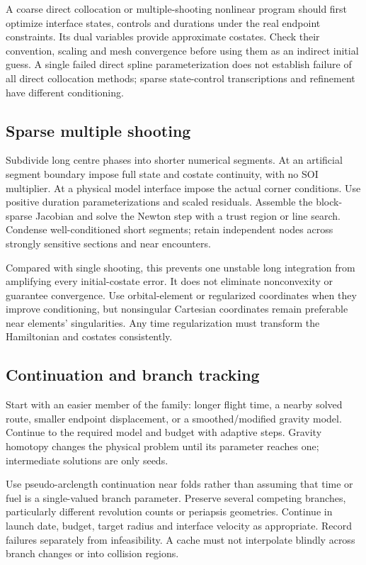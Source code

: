 \documentclass[journal, a4paper]{IEEEtran}
\begin{document}
A coarse direct collocation or multiple-shooting nonlinear program should first optimize interface states, controls and durations under the real endpoint constraints. Its dual variables provide approximate costates. Check their convention, scaling and mesh convergence before using them as an indirect initial guess. A single failed direct spline parameterization does not establish failure of all direct collocation methods; sparse state-control transcriptions and refinement have different conditioning.

\subsection{Sparse multiple shooting}
Subdivide long centre phases into shorter numerical segments. At an artificial segment boundary impose full state and costate continuity, with no SOI multiplier. At a physical model interface impose the actual corner conditions. Use positive duration parameterizations and scaled residuals. Assemble the block-sparse Jacobian and solve the Newton step with a trust region or line search. Condense well-conditioned short segments; retain independent nodes across strongly sensitive sections and near encounters.

Compared with single shooting, this prevents one unstable long integration from amplifying every initial-costate error. It does not eliminate nonconvexity or guarantee convergence. Use orbital-element or regularized coordinates when they improve conditioning, but nonsingular Cartesian coordinates remain preferable near elements' singularities. Any time regularization must transform the Hamiltonian and costates consistently.

\subsection{Continuation and branch tracking}
Start with an easier member of the family: longer flight time, a nearby solved route, smaller endpoint displacement, or a smoothed/modified gravity model. Continue to the required model and budget with adaptive steps. Gravity homotopy changes the physical problem until its parameter reaches one; intermediate solutions are only seeds.

Use pseudo-arclength continuation near folds rather than assuming that time or fuel is a single-valued branch parameter. Preserve several competing branches, particularly different revolution counts or periapsis geometries. Continue in launch date, budget, target radius and interface velocity as appropriate. Record failures separately from infeasibility. A cache must not interpolate blindly across branch changes or into collision regions.
\end{document}
